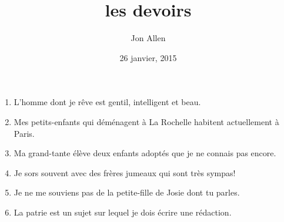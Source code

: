\documentclass[letterpaper]{article}
\begin{document}
\title{les devoirs}
\date{26 janvier, 2015}
\author{Jon Allen}
\maketitle
\doublespacing
\begin{enumerate}
\item
L'homme dont je rêve est gentil, intelligent et beau.
\item
Mes petits-enfants qui déménagent à La Rochelle habitent actuellement à Paris.
\item
Ma grand-tante élève deux enfants adoptés que je ne connais pas encore.
\item
Je sors souvent avec des frères jumeaux qui sont très sympas!
\item
Je ne me souviens pas de la petite-fille de Josie dont tu parles.
\item
La patrie est un sujet sur lequel je dois écrire une rédaction.
\end{enumerate}
\end{document}
